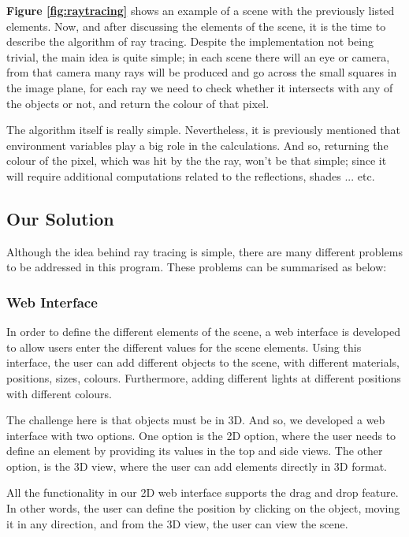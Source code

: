 \documentclass[a4paper]{article}
\begin{document}
	\par \textbf{Figure \ref{fig:raytracing}} shows an example of a scene with the previously listed elements. Now, and after discussing the elements of the scene, it is the time to describe the algorithm of ray tracing. Despite the implementation not being trivial, the main idea is quite simple; in each scene there will an eye or camera, from that camera many rays will be produced and go across the small squares in the image plane, for each ray we need to check whether it intersects with any of the objects or not, and return the colour of that pixel.\\
	\par The algorithm itself is really simple. Nevertheless, it is previously mentioned that environment variables play a big role in the calculations. And so, returning the colour of the pixel, which was hit by the the ray, won't be that simple; since it will require additional computations related to the reflections, shades ... etc. 
	\subsection{Our Solution}
	Although the idea behind ray tracing is simple, there are many different problems to be addressed in this program. These problems can be summarised as below:
	\subsubsection{Web Interface}
	In order to define the different elements of the scene, a web interface is developed to allow users enter the different values for the scene elements. Using this interface, the user can add different objects to the scene, with different materials, positions, sizes, colours. Furthermore, adding different lights at different positions with different colours. \\
	\par The challenge here is that objects must be in 3D. And so, we developed a web interface with two options. One option is the 2D option, where the user needs to define an element by providing its values in the top and side views. The other option, is the 3D view, where the user can add elements directly in 3D format.\\
	\par All the functionality in our 2D web interface supports the drag and drop feature. In other words, the user can define the position by clicking on the object, moving it in any direction, and from the 3D view, the user can view the scene.
\end{document}
